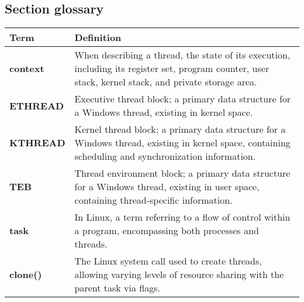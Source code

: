 \subsection*{Section glossary}
\centering
\begin{tabular}{>{\raggedright}p{} >{\raggedright\arraybackslash}p{}}
\toprule
\textbf{Term} & \textbf{Definition} \\
\midrule
\textbf{context} & When describing a thread, the state of its execution, including its register set, program counter, user stack, kernel stack, and private storage area. \\
\textbf{ETHREAD} & Executive thread block; a primary data structure for a Windows thread, existing in kernel space. \\
\textbf{KTHREAD} & Kernel thread block; a primary data structure for a Windows thread, existing in kernel space, containing scheduling and synchronization information. \\
\textbf{TEB} & Thread environment block; a primary data structure for a Windows thread, existing in user space, containing thread-specific information. \\
\textbf{task} & In Linux, a term referring to a flow of control within a program, encompassing both processes and threads. \\
\textbf{clone()} & The Linux system call used to create threads, allowing varying levels of resource sharing with the parent task via flags. \\
\bottomrule
\end{tabular}
\vspace{\baselineskip}
